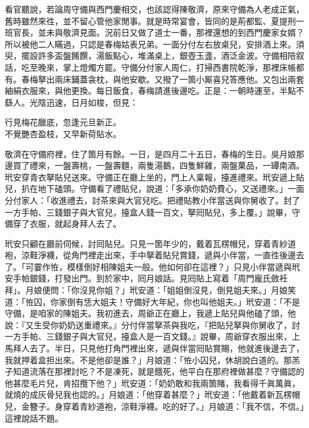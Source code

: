 看官聽說，若論周守備與西門慶相交，也該認得陳敬濟，原來守備為人老成正氣，舊時雖然來徃，並不留心管他家閒事。就是時常宴會，皆同的是荊都監、夏提刑一班官長，並未與敬濟見面。況前日又做了道士一番，那裡還想的到西門慶家女婿？所以被他二人瞞過，只認是春梅姑表兄弟。一面分付左右放桌兒，安排酒上來。須臾，擺設許多盃盤餚饌，湯飯點心，堆滿桌上，銀壺玉盞，酒泛金波。守備相陪叙話，吃至晚來，掌上燈燭方罷。守備分付家人周仁，打掃西書院乾淨，那裡床帳都有。春梅拏出兩床鋪蓋衾枕，與他安歇。又撥了一箇小厮喜兒答應他。又包出兩套紬絹衣服來，與他更換。每日飯食，春梅請進後邊吃。正是：一朝時運至，半點不繇人。光陰迅速，日月如梭，但見：

\begin{myquote}
行見梅花臘底，忽逢元旦新正。\\不覺艷杏盈枝，又早新荷貼水。
\end{myquote}

敬濟在守備府裡，住了箇月有餘。一日，是四月二十五日，春梅的生日。吳月娘那邊買了禮來，一盤壽桃，一盤壽麵，兩隻湯鵝，四隻鮮雞，兩盤菓品，一罈南酒。玳安穿青衣拏貼兒送來。守備正在廳上坐的，門上人稟報，擡進禮來。玳安遞上貼兒，扒在地下磕頭。守備看了禮貼兒，說道：「多承你奶奶費心，又送禮來。」一面分付家人：「收進禮去，討茶來與大官兒吃。把禮貼教小伴當送與你舅收了。封了一方手帕、三錢銀子與大官兒，擡盒人錢一百文，拏囘貼兒，多上覆。」說畢，守備穿了衣服，就起身拜人去了。

玳安只顧在廳前伺候，討囘貼兒。只見一箇年少的，戴着瓦楞帽兒，穿着青紗道袍，涼鞋淨襪，從角門裡走出來，手中拏着貼兒賞錢，遞與小伴當，一直徃後邊去了。「可霎作恠，模樣倒好相陳姐夫一般。他如何卻在這裡？」只見小伴當遞與玳安手帕銀錢，打發出門。到於家中，囘月娘話。見囘貼上寫着「周門龐氏斂衽拜」。月娘便問：「你沒見你姐？」玳安道：「姐姐倒沒見，倒見姐夫來。」月娘笑道：「恠囚，你家倒有恁大姐夫！守備好大年紀，你也叫他姐夫。」玳安道：「不是守備，是咱家的陳姐夫。我初進去，周爺正在廳上，我遞上貼兒與他磕了頭，他說：『又生受你奶奶送重禮來。』分付伴當拏茶與我吃，『把貼兒拏與你舅收了，討一方手帕、三錢銀子與大官兒，擡盒人是一百文錢。』說畢，周爺穿衣服出來，上馬拜人去了。半日，只見他打角門裡出來，遞與伴當囘貼賞賜，他就進後邊去了，我就押着盒担出來。不是他卻是誰？」月娘道：「恠小囚兒，休胡說白道的。那羔子知道流落在那裡討吃？不是凍死，就是餓死，他平白在那府裡做甚麼？守備認的他甚麼毛片兒，肯招攬下他？」玳安道：「奶奶敢和我兩箇賭，我看得千眞萬眞，就燒的成灰骨兒我也認的。」月娘道：「他穿着甚麼？」玳安道：「他戴着新瓦楞帽兒，金簪子。身穿着青紗道袍，涼鞋淨襪。吃的好了。」月娘道：「我不信，不信。」{}這裡說話不題。

